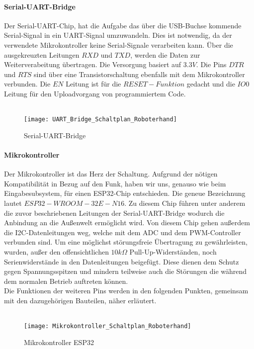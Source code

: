 \documentclass[titlepage,12pt,twoside]{article}
\begin{document}
\paragraph{Serial-UART-Bridge}
\hfill \break
\hfill \break
Der Serial-UART-Chip, hat die Aufgabe das über die USB-Buchse kommende Serial-Signal in ein UART-Signal umzuwandeln.
Dies ist notwendig, da der verwendete Mikrokontroller keine Serial-Signale verarbeiten kann. Über die ausgekreuzten
Leitungen $RXD$ und $TXD$, werden die Daten zur Weiterverabeitung übertragen. Die Versorgung basiert auf $3.3V$. Die Pins
$DTR$ und $RTS$ sind über eine Transistorschaltung ebenfalls mit dem Mikrokontroller verbunden. Die $EN$ Leitung ist für 
die $RESET-Funktion$ gedacht und die $IO0$ Leitung für den Uploadvorgang von programmiertem Code. \\
\\
\begin{figure}[H]
	\begin{center}
		\scalebox{0.6}
		{\texttt{[image: UART\_Bridge\_Schaltplan\_Roboterhand]}}
		\caption{Serial-UART-Bridge}
		\label{fig:UART_Bridge_Schaltplan_Roboterhand}	
	\end{center}
\end{figure}
\hfill \break

\paragraph{Mikrokontroller}
\hfill \break
\hfill \break
Der Mikrokontroller ist das Herz der Schaltung. Aufgrund der nötigen Kompatibilität in Bezug auf den Funk, haben wir uns, genauso wie beim Eingabesubsystem, für einen ESP32-Chip entschieden.
Die geneue Bezeichnung lautet $ESP32-WROOM-32E-N16$. Zu diesem Chip führen unter anderem die zuvor beschriebenen Leitungen der Serial-UART-Bridge wodurch die Anbindung an die Außenwelt ermöglicht 
wird. Von diesem Chip gehen außerdem die I2C-Datenleitungen weg, welche mit dem ADC und dem PWM-Controller verbunden sind. Um eine möglichst störungsfreie Übertragung zu gewährleisten, wurden, außer 
den offensichtlichen $10k\Omega$ Pull-Up-Widerständen, noch Serienwiderstände in den Datenleitungen beigefügt. Diese dienen dem Schutz gegen Spannungsspitzen und mindern teilweise auch die Störungen
die während dem normalen Betrieb auftreten können. \\
Die Funktionen der weiteren Pins werden in den folgenden Punkten, gemeinsam mit den dazugehörigen Bauteilen, näher erläutert. \\
\\
\begin{figure}[H]
	\begin{center}
		\scalebox{0.6}
		{\texttt{[image: Mikrokontroller\_Schaltplan\_Roboterhand]}}
		\caption{Mikrokontroller ESP32}
		\label{fig:Mikrokontroller_Schaltplan_Roboterhand}	
	\end{center}
\end{figure}
\hfill \break
\end{document}
